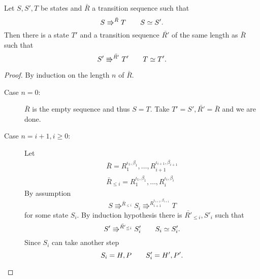 \begin{lemma} \label{lem:lemma3}
  Let $S, S', T$ be states and $\bar{R}$ a transition sequence such that
  \begin{equation*}
    S \Rrightarrow^{\bar{R}} T \quad\quad S \simeq S'.
  \end{equation*}
  Then there is a state $T'$ and a transition sequence $\bar{R'}$ of the same
  length as $\bar{R}$ such that
  \begin{equation*}
    S' \Rrightarrow^{\bar{R'}} T' \quad\quad T \simeq T'.
  \end{equation*}
\end{lemma}


\begin{proof}
  By induction on the length $n$ of $\bar{R}$.
  \begin{description}
    \item[Case $n = 0$:] $\bar{R}$ is the empty sequence and thus $S = T$. Take
      $T' = S', \bar{R'} = \bar{R}$ and we are done.
    \item[Case $n = i + 1, i \geq 0$:] Let
      \begin{equation*}
        \begin{gathered}
          \bar{R} = R_1^{\iota_1, \beta_1}, \dots, R_{i+1}^{\iota_{i+1},
          \beta_{i+1}} \\
          \bar{R}_{\leq i} = R_1^{\iota_1, \beta_1}, \dots, R_{i}^{\iota_{i},
          \beta_{i}}
        \end{gathered}
      \end{equation*}
      By assumption
      \begin{equation*}
        S \Rrightarrow^{\bar{R}_{\leq i}} S_i \Rrightarrow^{R_{i+1}^{\iota_{i+1},
        \beta_{i+1}}} T
      \end{equation*}
      for some state $S_i$. By induction hypothesis there is $\bar{R'}_{\leq i}, S'_i$
      such that
      \begin{equation}
        S' \Rrightarrow^{\bar{R'}_{\leq i}} S'_i \quad\quad S_i \simeq S'_i.
      \end{equation}
      Since $S_i$ can take another step
      \begin{equation*}
        S_i = H, P \quad\quad S'_i = H', P'.
      \end{equation*}
      

\end{description}
\end{proof}
